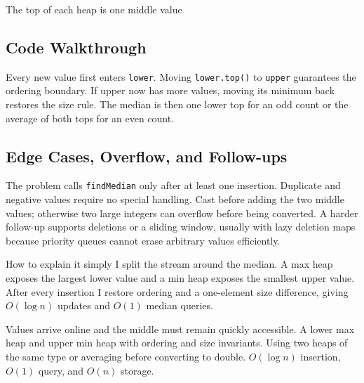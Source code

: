 \begin{visualbox}{The top of each heap is one middle value}
\centering
{}
\end{visualbox}

\subsection{Code Walkthrough}
Every new value first enters \texttt{lower}. Moving \texttt{lower.top()} to
\texttt{upper} guarantees the ordering boundary. If upper now has more
values, moving its minimum back restores the size rule. The median is
then one lower top for an odd count or the average of both tops for an even
count.

\subsection{Edge Cases, Overflow, and Follow-ups}
The problem calls \texttt{findMedian} only after at least one insertion.
Duplicate and negative values require no special handling. Cast before adding
the two middle values; otherwise two large integers can overflow before being
converted. A harder follow-up supports deletions or a sliding window, usually
with lazy deletion maps because priority queues cannot erase arbitrary values
efficiently.

\begin{revisionbox}{How to explain it simply}
I split the stream around the median. A max heap exposes the largest lower
value and a min heap exposes the smallest upper value. After every insertion I
restore ordering and a one-element size difference, giving \(O(\log n)\)
updates and \(O(1)\) median queries.
\end{revisionbox}
\chaptercheckpoint
  {Values arrive online and the middle must remain quickly accessible.}
  {A lower max heap and upper min heap with ordering and size invariants.}
  {Using two heaps of the same type or averaging before converting to double.}
  {$O(\log n)$ insertion, $O(1)$ query, and $O(n)$ storage.}
\judgeclassnote


